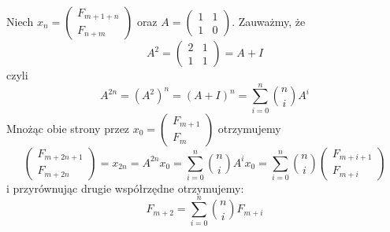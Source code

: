 \documentclass{article}[13pt]
\begin{document}
Niech $x_n=\begin{pmatrix}
    F_{m+1+n}\\F_{n+m}
\end{pmatrix}$ oraz $A=\begin{pmatrix}
    1&1\\1&0
\end{pmatrix}$. Zauważmy, że
$$A^2=\begin{pmatrix}
    2&1\\1&1
\end{pmatrix}=A+I$$
czyli
$$A^{2n}=(A^2)^n=(A+I)^n=\sum\limits_{i=0}^n{n\choose i}A^i$$
Mnożąc obie strony przez $x_0=\begin{pmatrix}
    F_{m+1}\\F_m
\end{pmatrix}$ otrzymujemy
$$\begin{pmatrix}F_{m+2n+1}\\F_{m+2n}\end{pmatrix}=x_{2n}=A^{2n}x_0=\sum\limits_{i=0}^n{n\choose i}A^ix_0=\sum\limits_{i=0}^n{n\choose i}\begin{pmatrix}
    F_{m+i+1}\\F_{m+i}
\end{pmatrix}$$
i przyrównując drugie współrzędne otrzymujemy:
$$F_{m+2}=\sum\limits_{i=0}^n{n\choose i}F_{m+i}$$
\end{document}
